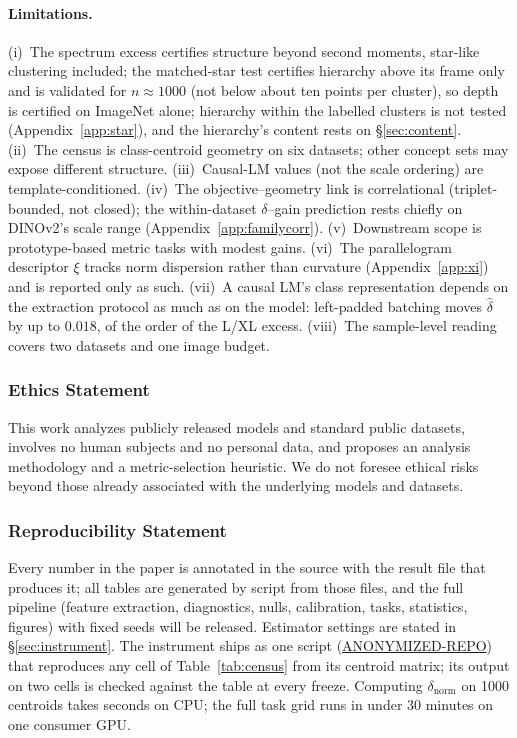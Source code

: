 \documentclass{article}
\begin{document}
\paragraph{Limitations.} (i)~The spectrum excess certifies structure beyond second moments, star-like clustering included; the matched-star test certifies hierarchy above its frame only and is validated for $n\approx1000$ (not below about ten points per cluster), so depth is certified on ImageNet alone; hierarchy within the labelled clusters is not tested (Appendix~\ref{app:star}), and the hierarchy's content rests on \S\ref{sec:content}. (ii)~The census is class-centroid geometry on six datasets; other concept sets may expose different structure. (iii)~Causal-LM values (not the scale ordering) are template-conditioned. (iv)~The objective--geometry link is correlational (triplet-bounded, not closed); the within-dataset $\delta$--gain prediction rests chiefly on DINOv2's scale range (Appendix~\ref{app:familycorr}). (v)~Downstream scope is prototype-based metric tasks with modest gains. (vi)~The parallelogram descriptor $\xi$ tracks norm dispersion rather than curvature (Appendix~\ref{app:xi}) and is reported only as such. (vii)~A causal LM's class representation depends on the extraction protocol as much as on the model: left-padded batching moves $\hat\delta$ by up to $0.018$, of the order of the L/XL excess. (viii)~The sample-level reading covers two datasets and one image budget.

\subsubsection*{Ethics Statement}
This work analyzes publicly released models and standard public datasets, involves no human subjects and no personal data, and proposes an analysis methodology and a metric-selection heuristic. We do not foresee ethical risks beyond those already associated with the underlying models and datasets.

\subsubsection*{Reproducibility Statement}
Every number in the paper is annotated in the source with the result file that produces it; all tables are generated by script from those files, and the full pipeline (feature extraction, diagnostics, nulls, calibration, tasks, statistics, figures) with fixed seeds will be released. Estimator settings are stated in \S\ref{sec:instrument}. The instrument ships as one script (\url{ANONYMIZED-REPO}) that reproduces any cell of Table~\ref{tab:census} from its centroid matrix; its output on two cells is checked against the table at every freeze. Computing $\delta_{\text{norm}}$ on 1000 centroids takes seconds on CPU; the full task grid runs in under 30 minutes on one consumer GPU.
\end{document}
